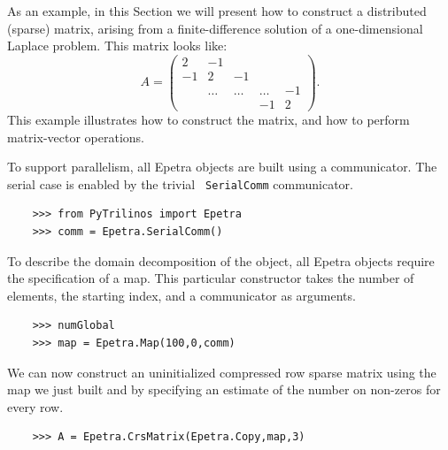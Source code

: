 \documentclass[10pt,relax]{SANDreport}
\begin{document}
As an example, in this Section we will present how to construct a
distributed (sparse) matrix, arising from a finite-difference solution
of a one-dimensional Laplace problem. This matrix looks like:
\begin{equation*}
  A = \begin{pmatrix}
     2 & -1     &        &        &    \\
    -1 &  2     & -1     &        &    \\
       & \ldots & \ldots & \ldots & -1 \\
       &        &        & -1     & 2
\end{pmatrix}.
\end{equation*}
This example illustrates how to construct the matrix, and how to
perform matrix-vector operations.

To support parallelism, all Epetra objects are built using a
communicator.  The serial case is enabled by the trivial {\tt
  SerialComm} communicator.
\begin{verbatim}
    >>> from PyTrilinos import Epetra
    >>> comm = Epetra.SerialComm()
\end{verbatim}

To describe the domain decomposition of the object, all Epetra objects
require the specification of a map.  This particular constructor takes
the number of elements, the starting index, and a communicator as
arguments.
\begin{verbatim}
    >>> numGlobal
    >>> map = Epetra.Map(100,0,comm)
\end{verbatim}

We can now construct an uninitialized compressed row sparse matrix
using the map we just built and by specifying an estimate of the
number on non-zeros for every row.
\begin{verbatim}
    >>> A = Epetra.CrsMatrix(Epetra.Copy,map,3)
\end{verbatim}
\end{document}
